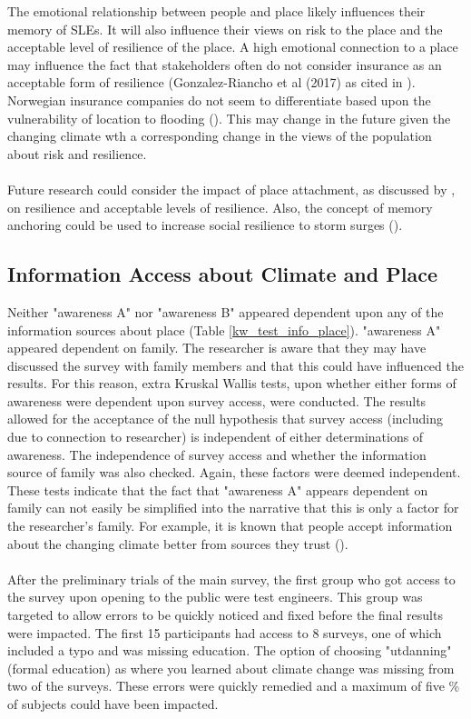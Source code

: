 The emotional relationship between people and place likely influences their memory of SLEs. It will also influence their views on risk to the place and the acceptable level of resilience of the place. A high emotional connection to a place may influence the fact that stakeholders often do not consider insurance as an acceptable form of resilience (Gonzalez-Riancho et al (2017) as cited in \cite{gerkensmeier_governing_2018}). Norwegian insurance companies do not seem to differentiate based upon the vulnerability of location to flooding (\cite{lujala_role_2020}). This may change in the future given the changing climate wth a corresponding change in the views of the population about risk and resilience.
\paragraph{}
Future research could consider the impact of place attachment, as discussed by \cite{ariccio_place_2021}, on resilience and acceptable levels of resilience. Also, the concept of memory anchoring could be used to increase social resilience to storm surges (\cite{de_guttry_expiry_2022}).  


\subsection{Information Access about Climate and Place}
Neither "awareness A" nor "awareness B" appeared dependent upon any of the information sources about place  (Table \ref{kw_test_info_place}). "awareness A" appeared dependent on family. The researcher is aware that they may have discussed the survey with family members and that this could have influenced the results. For this reason, extra Kruskal Wallis tests, upon whether either forms of awareness were dependent upon survey access, were conducted. The results allowed for the acceptance of the null hypothesis that survey access (including due to connection to researcher) is independent of either determinations of awareness. The independence of survey access and whether the information source of family was also checked. Again, these factors were deemed independent. These tests indicate that the fact that "awareness A" appears dependent on family can not easily be simplified into the narrative that this is only a factor for the researcher's family. For example, it is known that people accept information about the changing climate better from sources they trust (\cite{corner_a_principles_2018}). 
\paragraph{}
After the preliminary trials of the main survey, the first group who got access to the survey upon opening to the public were test engineers. This group was targeted to allow errors to be quickly noticed and fixed before the final results were impacted. The first 15 participants had access to 8 surveys, one of which included a typo and was missing education. The option of choosing "utdanning" (formal education) as where you learned about climate change was missing from two of the surveys. These errors were quickly remedied and a maximum of five \% of subjects could have been impacted. 
